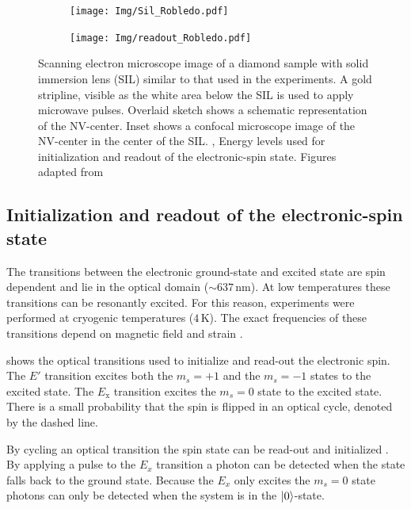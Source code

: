 \begin{figure}[htbp]
    \centering
    \begin{subfigure}[t]{0.49\textwidth}\centering
        \caption{}
        \label{fig:Sil_Robledo}
        \texttt{[image: Img/Sil\_Robledo.pdf]}
    \end{subfigure}
    \begin{subfigure}[t]{0.49\textwidth}\centering
       \caption{}
       \label{fig:readoutRobledo}
       \texttt{[image: Img/readout\_Robledo.pdf]}
   \end{subfigure}
   \caption{\textbf{} Scanning electron microscope image of a diamond sample with solid immersion lens (SIL) similar to that used in the experiments.
   A gold stripline, visible as the white area below the SIL is used to apply microwave pulses.
   Overlaid sketch shows a schematic representation of the NV-center. Inset shows a confocal microscope image of the NV-center in the center of the SIL. \textbf{}, Energy levels used for initialization and readout of the electronic-spin state. Figures adapted from \citet{Robledo2011HighFidelity}}
\end{figure}

\subsection{Initialization and readout of the electronic-spin state}
The transitions between the electronic ground-state and excited state are spin dependent and lie in the optical domain ($\sim 637\, \mathrm{ nm}$).
At low temperatures these transitions can be resonantly excited.
For this reason, experiments were performed at cryogenic temperatures ($4\,\mathrm{K}$).
The exact frequencies of these transitions depend on magnetic field and strain \citep{Hensen2011MeasurementBased}.

 shows the optical transitions used to initialize and read-out the electronic spin.
The $E'$ transition excites both the $m_s =+1$ and the $m_s=-1$ states to the excited state.
The $E_\mathrm{x}$ transition excites the $m_s = 0$ state to the excited state.
There is a small probability that the spin is flipped in an optical cycle, denoted by the dashed line.

By cycling an optical transition the spin state can be read-out and initialized \citep{Robledo2011HighFidelity}.
By applying a pulse to the $E_x$ transition a photon can be detected when the state falls back to the ground state.
Because the $E_x$ only excites the $m_s=0$ state photons can only be detected when the system is in the ${\left\vert{0}\right\rangle}$-state.

